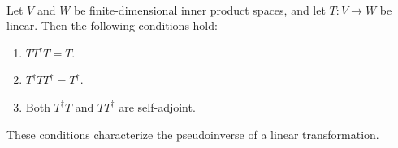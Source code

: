 \begin{lemma}
	\hfill\\
	Let $V$ and $W$ be finite-dimensional inner product spaces, and let $T: V \to W$ be linear. Then the following conditions hold:

	\begin{enumerate}
		\item $TT^\dagger T = T$.
		\item $T^\dagger TT^\dagger = T^\dagger$.
		\item Both $T^\dagger T$ and $TT^\dagger$ are self-adjoint.
	\end{enumerate}

	These conditions characterize the pseudoinverse of a linear transformation.
\end{lemma}
